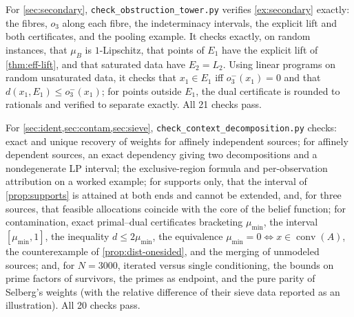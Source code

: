 \documentclass[11pt]{article}
\theoremstyle{definition}
\theoremstyle{remark}
\begin{document}
For \cref{sec:secondary}, \texttt{check\_obstruction\_tower.py} verifies \cref{ex:secondary} exactly:
the fibres, $o_3$ along each fibre, the indeterminacy intervals, the explicit lift and both
certificates, and the pooling example. It checks exactly, on random instances, that $\mu_B$ is
$1$-Lipschitz, that points of $E_1$ have the explicit lift of \cref{thm:eff-lift}, and that saturated
data have $E_2=L_2$. Using linear programs on random unsaturated data, it checks that $x_1\in E_1$ iff
$o_3^-(x_1)=0$ and that $d(x_1,E_1)\le o_3^-(x_1)$; for points outside $E_1$, the dual certificate is
rounded to rationals and verified to separate exactly. All 21 checks pass.

For \cref{sec:ident,sec:contam,sec:sieve}, \texttt{check\_context\_decomposition.py} checks: exact and
unique recovery of weights for affinely independent sources; for affinely dependent sources, an exact
dependency giving two decompositions and a nondegenerate LP interval; the exclusive-region formula and
per-observation attribution on a worked example; for supports only, that the interval of
\cref{prop:supports} is attained at both ends and cannot be extended, and, for three sources, that
feasible allocations coincide with the core of the belief function; for contamination, exact
primal--dual certificates bracketing $\mu_{\min}$, the interval $[\mu_{\min},1]$, the inequality
$d\le2\mu_{\min}$, the equivalence $\mu_{\min}=0\iff x\in\operatorname{conv}(A)$, the counterexample of
\cref{prop:dist-onesided}, and the merging of unmodeled sources; and, for $N=3000$, iterated versus
single conditioning, the bounds on prime factors of survivors, the primes as endpoint, and the pure
parity of Selberg's weights (with the relative difference of their sieve data reported as an
illustration). All 20 checks pass.
\end{document}
